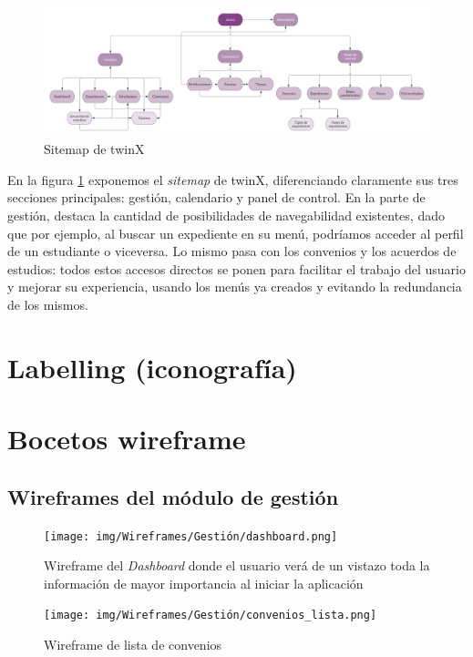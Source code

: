 \begin{figure}
	\centering
	\includegraphics[width=\textwidth]{img/sitemap}
	\caption{Sitemap de twinX}
	\label{fig:sitemap}
\end{figure}

En la figura \ref{fig:sitemap} exponemos el \textit{sitemap} de twinX, diferenciando claramente sus tres secciones principales: gestión, calendario y panel de control. En la parte de gestión, destaca la cantidad de posibilidades de navegabilidad existentes, dado que por ejemplo, al buscar un expediente en su menú, podríamos acceder al perfil de un estudiante o viceversa. Lo mismo pasa con los convenios y los acuerdos de estudios: todos estos accesos directos se ponen para facilitar el trabajo del usuario y mejorar su experiencia, usando los menús ya creados y evitando la redundancia de los mismos.


\section{Labelling (iconografía)}
\section{Bocetos wireframe}

\subsection{Wireframes del módulo de gestión}

\begin{figure}
	\centering
	\texttt{[image: img/Wireframes/Gestión/dashboard.png]}
	\caption[Wireframe de \textit{Dashboard}]{Wireframe del \textit{Dashboard} donde el usuario verá de un vistazo toda la información de mayor importancia al iniciar la aplicación}
	\label{fig:dashboardWF}
\end{figure}

\begin{figure}
	\centering
	\texttt{[image: img/Wireframes/Gestión/convenios\_lista.png]}
	\caption{Wireframe de lista de convenios}
	\label{fig:convenios_listaWF}
\end{figure}

